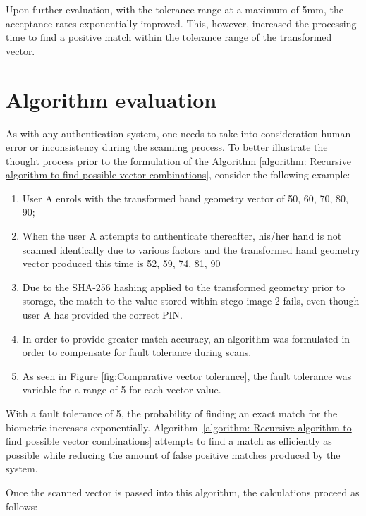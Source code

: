Upon further evaluation, with the tolerance range at a maximum of 5mm, the acceptance rates exponentially improved. This, however, increased the processing time to find a positive match within the tolerance range of the transformed vector. 

\section{Algorithm evaluation}

As with any authentication system, one needs to take into consideration human error or inconsistency during the scanning process. To better illustrate the thought process prior to the formulation of the Algorithm \ref{algorithm: Recursive algorithm to find possible vector combinations}, consider the following example:

\begin{enumerate}[label=\roman*.]
    \item User A enrols with the transformed hand geometry vector of {50, 60, 70, 80, 90};
    \item When the user A attempts to authenticate thereafter, his/her hand is not scanned identically due to various factors and the transformed hand geometry vector produced this time is {52, 59, 74, 81, 90}
    \item Due to the SHA-256 hashing applied to the transformed geometry prior to storage, the match to the value stored within stego-image 2 fails, even though user A has provided the correct PIN.
    \item In order to provide greater match accuracy, an algorithm was formulated in order to compensate for fault tolerance during scans.
    \item As seen in Figure \ref{fig:Comparative vector tolerance}, the fault tolerance was variable for a range of 5 for each vector value.
\end{enumerate}

With a fault tolerance of 5, the probability of finding an exact match for the biometric increases exponentially. Algorithm~\ref{algorithm: Recursive algorithm to find possible vector combinations} attempts to find a match as efficiently as possible while reducing the amount of false positive matches produced by the system.

Once the scanned vector is passed into this algorithm, the calculations proceed as follows:

